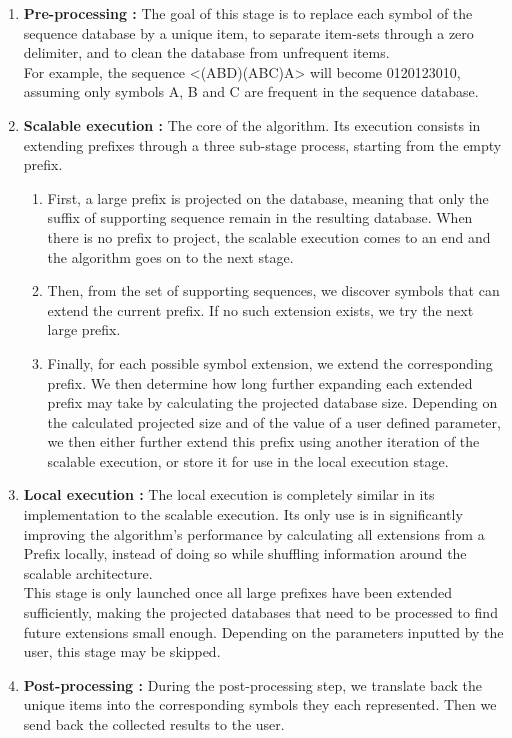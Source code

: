 \documentclass{eplmastersthesis}
\begin{document}
\begin{enumerate}
\item \textbf{Pre-processing :} The goal of this stage is to replace each symbol of the sequence database by a unique item, to separate item-sets through a zero delimiter, and to clean the database from unfrequent items. \\
For example, the sequence <(ABD)(ABC)A> will become 0120123010, assuming only symbols A, B and C are frequent in the sequence database.
\item \textbf{Scalable execution :} The core of the algorithm. Its execution consists in extending prefixes through a three sub-stage process, starting from the empty prefix.
	\begin{enumerate}
	\item First, a large prefix is projected on the database, meaning that only the suffix of supporting sequence remain in the resulting database. When there is no prefix to project, the scalable execution comes to an end and the algorithm goes on to the next stage.
	\item Then, from the set of supporting sequences, we discover symbols that can extend the current prefix. If no such extension exists, we try the next large prefix.
	\item Finally, for each possible symbol extension, we extend the corresponding prefix. We then determine how long further expanding each extended prefix may take by calculating the projected database size. Depending on the calculated projected size and of the value of a user defined parameter, we then either further extend this prefix using another iteration of the scalable execution, or store it for use in the local execution stage. 
	\end{enumerate}
\item \textbf{Local execution :} The local execution is completely similar in its implementation to the scalable execution. Its only use is in significantly improving the algorithm's performance by calculating all extensions from a Prefix locally, instead of doing so while shuffling information around the scalable architecture. \\
This stage is only launched once all large prefixes have been extended sufficiently, making the projected databases that need to be processed to find future extensions small enough. Depending on the parameters inputted by the user, this stage may be skipped.
\item \textbf{Post-processing :} During the post-processing step, we translate back the unique items into the corresponding symbols they each represented. Then we send back the collected results to the user.
\end{enumerate}
\end{document}
